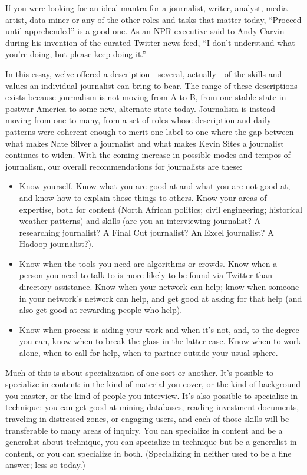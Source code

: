 If you were looking for an ideal mantra for a journalist, writer, analyst, media artist,
data miner or any of the other roles and tasks that matter today, ``Proceed until
apprehended'' is a good one. As an NPR executive said to Andy Carvin during
his invention of the curated Twitter news feed, ``I don’t understand what you’re
doing, but please keep doing it.''

In this essay, we’ve offered a description—several, actually—of the skills and values
an individual journalist can bring to bear. The range of these descriptions exists
because journalism is not moving from A to B, from one stable state in postwar
America to some new, alternate state today. Journalism is instead moving from one
to many, from a set of roles whose description and daily patterns were coherent
enough to merit one label to one where the gap between what makes Nate Silver
a journalist and what makes Kevin Sites a journalist continues to widen.
With the coming increase in possible modes and tempos of journalism, our overall
recommendations for journalists are these:
\begin{itemize}
\item Know yourself. Know what you are good at and what you are not good
at, and know how to explain those things to others. Know your areas
of expertise, both for content (North African politics; civil engineering;
historical weather patterns) and skills (are you an interviewing journalist?
A researching journalist? A Final Cut journalist? An Excel journalist?
A Hadoop journalist?).

\item  Know when the tools you need are algorithms or crowds. Know when
a person you need to talk to is more likely to be found via Twitter than
directory assistance. Know when your network can help; know when
someone in your network’s network can help, and get good at asking
for that help (and also get good at rewarding people who help).

\item Know when process is aiding your work and when it’s not, and, to the
degree you can, know when to break the glass in the latter case. Know
when to work alone, when to call for help, when to partner outside
your usual sphere.
\end{itemize}


Much of this is about specialization of one sort or another. It’s possible to specialize
in content: in the kind of material you cover, or the kind of background
you master, or the kind of people you interview. It’s also possible to specialize
in technique: you can get good at mining databases, reading investment documents,
traveling in distressed zones, or engaging users, and each of those skills will
be transferable to many areas of inquiry. You can specialize in content and be a
generalist about technique, you can specialize in technique but be a generalist in
content, or you can specialize in both. (Specializing in neither used to be a fine
answer; less so today.)

